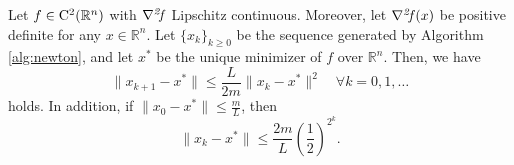 \documentclass[10pt,a4paper]{article}
\begin{document}
\begin{theorem}\label{thm:newton}
	Let $f\in \mathord{\mathrm{C^2}}(\mathbb{R}^n)$ with $\operatorname*{\mathit{\nabla^2 \!f}}$ Lipschitz continuous. Moreover, let $\operatorname*{\mathit{\nabla^2 \!f}}(x)$ be positive definite for any $x \in \mathbb{R}^n$. Let $\{x_k\}_{k \geq 0}$ be the sequence generated by Algorithm \ref{alg:newton}, and let $x^*$ be the unique minimizer of $f$ over $\mathbb{R}^n$. Then, we have 
	\begin{equation}\label{eq:newton_contraction}
		\|x_{k+1} - x^*\| \leq \frac{L}{2m}\|x_k - x^*\|^2 \quad \forall k = 0, 1, \ldots
	\end{equation}
	holds. In addition, if $\|x_0 - x^*\| \leq \frac{m}{L}$, then
	\begin{equation}\label{eq:local_newton}
		\|x_k - x^*\| \leq \frac{2m}{L} \left(\frac{1}{2}\right)^{2^k}.
	\end{equation}
\end{theorem}
\end{document}
